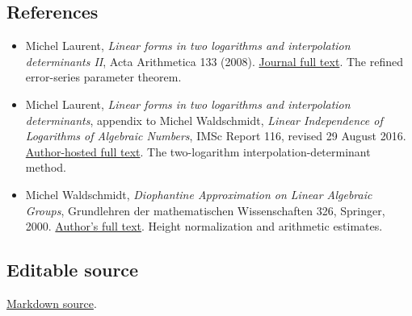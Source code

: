 \documentclass[
  11pt,
  a4paper,
]{article}
\providecommand{\tightlist}{%
  \setlength{\itemsep}{0pt}\setlength{\parskip}{0pt}}
\begin{document}
\subsection{References}\label{references}

\begin{itemize}
\tightlist
\item
  Michel Laurent, \emph{Linear forms in two logarithms and interpolation
  determinants II}, Acta Arithmetica 133 (2008).
  \href{https://www.impan.pl/shop/publication/transaction/download/product/82485}{Journal
  full text}. The refined error-series parameter theorem.
\item
  Michel Laurent, \emph{Linear forms in two logarithms and interpolation
  determinants}, appendix to Michel Waldschmidt, \emph{Linear
  Independence of Logarithms of Algebraic Numbers}, IMSc Report 116,
  revised 29 August 2016.
  \href{https://webusers.imj-prg.fr/~michel.waldschmidt/articles/pdf/LIL.pdf}{Author-hosted
  full text}. The two-logarithm interpolation-determinant method.
\item
  Michel Waldschmidt, \emph{Diophantine Approximation on Linear
  Algebraic Groups}, Grundlehren der mathematischen Wissenschaften 326,
  Springer, 2000.
  \href{https://webusers.imj-prg.fr/~michel.waldschmidt/articles/pdf/dalag.pdf}{Author's
  full text}. Height normalization and arithmetic estimates.
\end{itemize}

\subsection{Editable source}\label{editable-source}

\href{https://kokunoyumeto.github.io/open-math-courses-public/courses/TR-BAKER/src/TR-BAKER-06.md}{Markdown source}.
\end{document}
